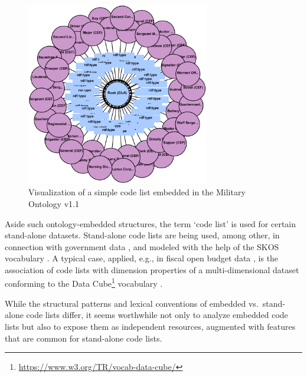 \begin{figure}[ht]
\centering
\includegraphics[width=8cm]{figures/code-list-visualized}
\caption{Visualization of a simple code list embedded in the Military Ontology v1.1 \cite{military_ontology}}
\label{fig:code-list-visualized}
\end{figure}

Aside such ontology-embedded structures, 
the term `code list' is used for certain stand-alone datasets. %
Stand-alone code lists are being used, among other, in connection with government data %
\cite{guide_code_list}, and modeled with the help of
the SKOS vocabulary \cite{miles2009skos}. 
A typical case, applied, e.g., in fiscal open budget data \cite{DBLP:conf/smap/FilippidisKKIB16}, is the association of code lists with dimension properties of a multi-dimensional dataset conforming to the Data Cube\footnote{\url{https://www.w3.org/TR/vocab-data-cube/}} vocabulary \cite{obeu_dcv}.

While the structural patterns and lexical conventions of embedded vs.~stand-alone code lists differ, it seems worthwhile not only to analyze embedded code lists but also to expose them as independent resources, augmented with features that are common for stand-alone code lists. 

